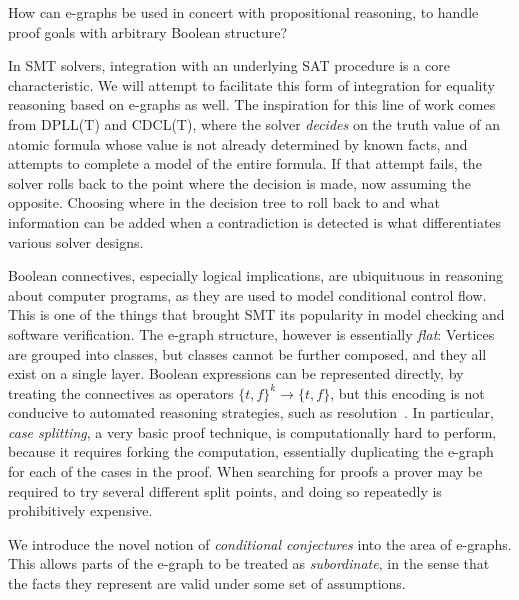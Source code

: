 \begin{researchquestion}How can e-graphs be used in concert with propositional reasoning, to handle proof goals with arbitrary Boolean structure?
\end{researchquestion}

In SMT solvers, integration with an underlying SAT procedure is a core characteristic.
We will attempt to facilitate this form of integration for equality reasoning based on e-graphs as well.
The inspiration for this line of work comes from DPLL(T) and CDCL(T), where the solver \emph{decides} on the truth value of an atomic formula whose value is not already determined by known facts, and attempts to complete a model of the entire formula.
If that attempt fails, the solver rolls back to the point where the decision is made, now assuming the opposite.
Choosing where in the decision tree to roll back to and what information can be added when a contradiction is detected is what differentiates various solver designs.

Boolean connectives, especially logical implications, are ubiquituous in reasoning about computer programs, as they are used to model conditional control flow.
This is one of the things that brought SMT its popularity in model checking and software verification.
The e-graph structure, however is essentially \emph{flat}: Vertices are grouped into classes, but classes cannot be further composed, and they all exist on a single layer.
Boolean expressions can be represented directly, by treating the connectives as operators $\{t,f\}^k\to\{t,f\}$, but this encoding is not conducive to automated reasoning strategies, such as resolution~\cite{JACM1965:Robinson,IJCM1965:Robinson}.
In particular, \emph{case splitting}, a very basic proof technique, is computationally hard to perform, because it requires forking the computation, essentially duplicating the e-graph for each of the cases in the proof.
When searching for proofs a prover may be required to try several different split points, and doing so repeatedly is prohibitively expensive.

We introduce the novel notion of \emph{conditional conjectures} into the area of e-graphs.
This allows parts of the e-graph to be treated as \emph{subordinate}, in the sense that the facts they represent are valid under some set of assumptions.


